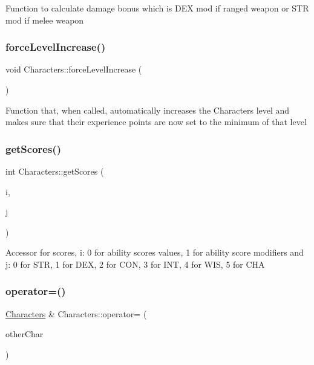 Function to calculate damage bonus which is D\+EX mod if ranged weapon or S\+TR mod if melee weapon \hypertarget{class_characters_ac5909582bf15fe17b7a6fa5104c26dd6}{}\label{class_characters_ac5909582bf15fe17b7a6fa5104c26dd6} 
\subsubsection{\texorpdfstring{force\+Level\+Increase()}{forceLevelIncrease()}}
{\footnotesize\ttfamily void Characters\+::force\+Level\+Increase (\begin{DoxyParamCaption}{ }\end{DoxyParamCaption})\hspace{0.3cm}{\ttfamily [virtual]}}

Function that, when called, automatically increases the Character\textquotesingle{}s level and makes sure that their experience points are now set to the minimum of that level \hypertarget{class_characters_a498fb8e0caaa6503fbb1e1694a082c4c}{}\label{class_characters_a498fb8e0caaa6503fbb1e1694a082c4c} 
\subsubsection{\texorpdfstring{get\+Scores()}{getScores()}}
{\footnotesize\ttfamily int Characters\+::get\+Scores (\begin{DoxyParamCaption}\item[{int}]{i,  }\item[{int}]{j }\end{DoxyParamCaption})}

Accessor for scores, i\+: 0 for ability scores values, 1 for ability score modifiers and j\+: 0 for S\+TR, 1 for D\+EX, 2 for C\+ON, 3 for I\+NT, 4 for W\+IS, 5 for C\+HA \hypertarget{class_characters_a161bd4230b1ff594c36db697ee2d3707}{}\label{class_characters_a161bd4230b1ff594c36db697ee2d3707} 
\subsubsection{\texorpdfstring{operator=()}{operator=()}}
{\footnotesize\ttfamily \hyperlink{class_characters}{Characters} \& Characters\+::operator= (\begin{DoxyParamCaption}\item[{const \hyperlink{class_characters}{Characters} $\ast$}]{other\+Char }\end{DoxyParamCaption})}

